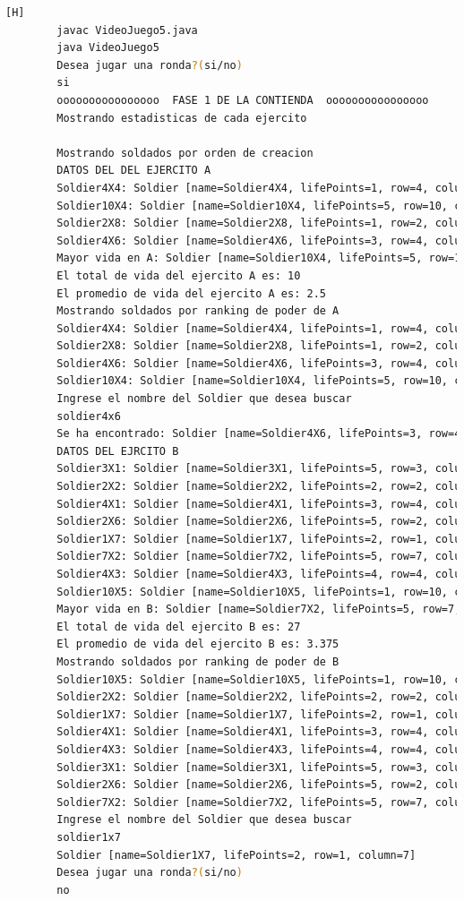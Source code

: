 \documentclass{article}
\begin{document}
		\begin{lstlisting}[language=bash,caption={Compilando y probando }][H]
		javac VideoJuego5.java
		java VideoJuego5
		Desea jugar una ronda?(si/no)
		si
		oooooooooooooooo  FASE 1 DE LA CONTIENDA  oooooooooooooooo
		Mostrando estadisticas de cada ejercito
		
		Mostrando soldados por orden de creacion
		DATOS DEL DEL EJERCITO A
		Soldier4X4: Soldier [name=Soldier4X4, lifePoints=1, row=4, column=4]
		Soldier10X4: Soldier [name=Soldier10X4, lifePoints=5, row=10, column=4]
		Soldier2X8: Soldier [name=Soldier2X8, lifePoints=1, row=2, column=8]
		Soldier4X6: Soldier [name=Soldier4X6, lifePoints=3, row=4, column=6]
		Mayor vida en A: Soldier [name=Soldier10X4, lifePoints=5, row=10, column=4]
		El total de vida del ejercito A es: 10
		El promedio de vida del ejercito A es: 2.5
		Mostrando soldados por ranking de poder de A
		Soldier4X4: Soldier [name=Soldier4X4, lifePoints=1, row=4, column=4]
		Soldier2X8: Soldier [name=Soldier2X8, lifePoints=1, row=2, column=8]
		Soldier4X6: Soldier [name=Soldier4X6, lifePoints=3, row=4, column=6]
		Soldier10X4: Soldier [name=Soldier10X4, lifePoints=5, row=10, column=4]
		Ingrese el nombre del Soldier que desea buscar
		soldier4x6
		Se ha encontrado: Soldier [name=Soldier4X6, lifePoints=3, row=4, column=6]
		DATOS DEL EJRCITO B
		Soldier3X1: Soldier [name=Soldier3X1, lifePoints=5, row=3, column=1]
		Soldier2X2: Soldier [name=Soldier2X2, lifePoints=2, row=2, column=2]
		Soldier4X1: Soldier [name=Soldier4X1, lifePoints=3, row=4, column=1]
		Soldier2X6: Soldier [name=Soldier2X6, lifePoints=5, row=2, column=6]
		Soldier1X7: Soldier [name=Soldier1X7, lifePoints=2, row=1, column=7]
		Soldier7X2: Soldier [name=Soldier7X2, lifePoints=5, row=7, column=2]
		Soldier4X3: Soldier [name=Soldier4X3, lifePoints=4, row=4, column=3]
		Soldier10X5: Soldier [name=Soldier10X5, lifePoints=1, row=10, column=5]
		Mayor vida en B: Soldier [name=Soldier7X2, lifePoints=5, row=7, column=2]
		El total de vida del ejercito B es: 27
		El promedio de vida del ejercito B es: 3.375
		Mostrando soldados por ranking de poder de B
		Soldier10X5: Soldier [name=Soldier10X5, lifePoints=1, row=10, column=5]
		Soldier2X2: Soldier [name=Soldier2X2, lifePoints=2, row=2, column=2]
		Soldier1X7: Soldier [name=Soldier1X7, lifePoints=2, row=1, column=7]
		Soldier4X1: Soldier [name=Soldier4X1, lifePoints=3, row=4, column=1]
		Soldier4X3: Soldier [name=Soldier4X3, lifePoints=4, row=4, column=3]
		Soldier3X1: Soldier [name=Soldier3X1, lifePoints=5, row=3, column=1]
		Soldier2X6: Soldier [name=Soldier2X6, lifePoints=5, row=2, column=6]
		Soldier7X2: Soldier [name=Soldier7X2, lifePoints=5, row=7, column=2]
		Ingrese el nombre del Soldier que desea buscar
		soldier1x7
		Soldier [name=Soldier1X7, lifePoints=2, row=1, column=7]
		Desea jugar una ronda?(si/no)
		no
	\end{lstlisting}
	
\end{document}
